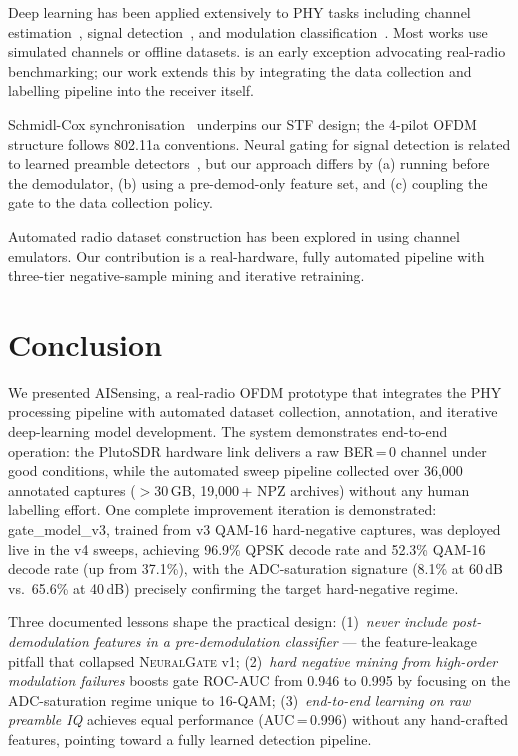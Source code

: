 \documentclass[conference]{IEEEtran}
\newcommand{\sys}{AISensing}
\newcommand{\gate}{\textsc{NeuralGate}}
\begin{document}
Deep learning has been applied extensively to PHY tasks including
channel estimation~\cite{ye2018power}, signal detection~\cite{samuel2019deep},
and modulation classification~\cite{oshea2016convolutional}.
Most works use simulated channels or offline datasets.
\cite{o2017introduction} is an early exception advocating real-radio
benchmarking; our work extends this by integrating the data collection
and labelling pipeline into the receiver itself.

Schmidl-Cox synchronisation~\cite{schmidl1997robust} underpins our STF
design; the 4-pilot OFDM structure follows 802.11a conventions.
Neural gating for signal detection is related to learned preamble
detectors~\cite{peng2019deep}, but our approach differs by (a) running
before the demodulator, (b) using a pre-demod-only feature set, and
(c) coupling the gate to the data collection policy.

Automated radio dataset construction has been explored in
\cite{oshea2016convolutional,west2017deep} using channel emulators.
Our contribution is a real-hardware, fully automated pipeline with
three-tier negative-sample mining and iterative retraining.

\section{Conclusion}
\label{sec:conclusion}

We presented \sys, a real-radio OFDM prototype that integrates the PHY
processing pipeline with automated dataset collection, annotation, and
iterative deep-learning model development.
The system demonstrates end-to-end operation: the PlutoSDR hardware link
delivers a raw BER\,=\,0 channel under good conditions, while the
automated sweep pipeline collected over 36{,}000 annotated captures
($>$30\,GB, 19{,}000\,+ NPZ archives) without any human labelling effort.
One complete improvement iteration is demonstrated: gate\_model\_v3,
trained from v3 QAM-16 hard-negative captures, was deployed live in the
v4 sweeps, achieving 96.9\% QPSK decode rate and 52.3\% QAM-16 decode
rate (up from 37.1\%), with the ADC-saturation signature (8.1\% at 60\,dB
vs.\ 65.6\% at 40\,dB) precisely confirming the target hard-negative regime.

Three documented lessons shape the practical design:
(1)~\emph{never include post-demodulation features in a pre-demodulation
classifier} — the feature-leakage pitfall that collapsed \gate{} v1;
(2)~\emph{hard negative mining from high-order modulation failures}
boosts gate ROC-AUC from 0.946 to 0.995 by focusing on the
ADC-saturation regime unique to 16-QAM;
(3)~\emph{end-to-end learning on raw preamble IQ} achieves equal
performance (AUC\,=\,0.996) without any hand-crafted features,
pointing toward a fully learned detection pipeline.
\end{document}
